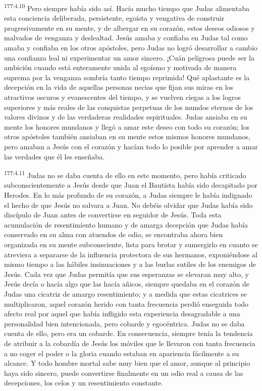 \par 
\textsuperscript{177:4.10} Pero siempre había sido así. Hacía mucho tiempo que Judas alimentaba esta conciencia deliberada, persistente, egoísta y vengativa de construir progresivamente en su mente, y de albergar en su corazón, estos deseos odiosos y malvados de venganza y deslealtad. Jesús amaba y confiaba en Judas tal como amaba y confiaba en los otros apóstoles, pero Judas no logró desarrollar a cambio una confianza leal ni experimentar un amor sincero. ¡Cuán peligrosa puede ser la ambición cuando está enteramente unida al egoísmo y motivada de manera suprema por la venganza sombría tanto tiempo reprimida! Qué aplastante es la decepción en la vida de aquellas personas necias que fijan sus miras en los atractivos oscuros y evanescentes del tiempo, y se vuelven ciegas a los logros superiores y más reales de las conquistas perpetuas de los mundos eternos de los valores divinos y de las verdaderas realidades espirituales. Judas ansiaba en su mente los honores mundanos y llegó a amar este deseo con todo su corazón; los otros apóstoles también ansiaban en su mente estos mismos honores mundanos, pero amaban a Jesús con el corazón y hacían todo lo posible por aprender a amar las verdades que él les enseñaba.

\par 
\textsuperscript{177:4.11} Judas no se daba cuenta de ello en este momento, pero había criticado subconscientemente a Jesús desde que Juan el Bautista había sido decapitado por Herodes. En lo más profundo de su corazón, a Judas siempre le había indignado el hecho de que Jesús no salvara a Juan. No debéis olvidar que Judas había sido discípulo de Juan antes de convertirse en seguidor de Jesús. Toda esta acumulación de resentimiento humano y de amarga decepción que Judas había conservado en su alma con atuendos de odio, se encontraba ahora bien organizada en su mente subconsciente, lista para brotar y sumergirlo en cuanto se atreviera a separarse de la influencia protectora de sus hermanos, exponiéndose al mismo tiempo a las hábiles insinuaciones y a las burlas sutiles de los enemigos de Jesús. Cada vez que Judas permitía que sus esperanzas se elevaran muy alto, y Jesús decía o hacía algo que las hacía añicos, siempre quedaba en el corazón de Judas una cicatriz de amargo resentimiento; y a medida que estas cicatrices se multiplicaron, aquel corazón herido con tanta frecuencia perdió enseguida todo afecto real por aquel que había infligido esta experiencia desagradable a una personalidad bien intencionada, pero cobarde y egocéntrica. Judas no se daba cuenta de ello, pero era un cobarde. En consecuencia, siempre tenía la tendencia de atribuir a la cobardía de Jesús los móviles que le llevaron con tanta frecuencia a no coger el poder o la gloria cuando estaban en apariencia fácilmente a su alcance. Y todo hombre mortal sabe muy bien que el amor, aunque al principio haya sido sincero, puede convertirse finalmente en un odio real a causa de las decepciones, los celos y un resentimiento constante.

